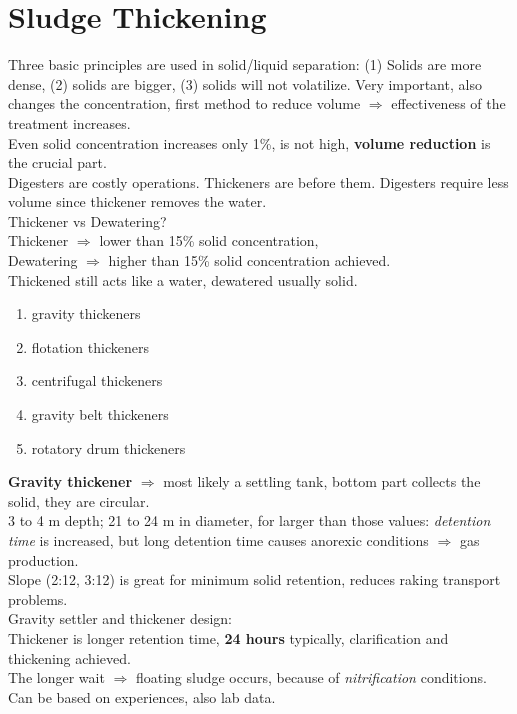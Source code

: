 \documentclass{article}
\numberwithin{equation}{section}
\begin{document}
\section{Sludge Thickening}
Three basic principles are used in solid/liquid separation: (1) Solids are more dense, (2) solids are bigger, (3) solids will not volatilize. Very important, also changes the concentration, first method to reduce volume
$\Rightarrow$ effectiveness of the treatment increases.\\
Even solid concentration increases only 1\%, is not high, \textbf{volume reduction} is the crucial part.\\
Digesters are costly operations. Thickeners are before them. Digesters require less volume since thickener removes the water.\\
Thickener vs Dewatering?\\
Thickener $\Rightarrow$ lower than 15\% solid concentration,\\
Dewatering $\Rightarrow$ higher than 15\% solid concentration achieved.\\
Thickened still acts like a water, dewatered usually solid.
\begin{enumerate}
    \item gravity thickeners
    \item flotation thickeners
    \item centrifugal thickeners
    \item gravity belt thickeners
    \item rotatory drum thickeners
\end{enumerate}
\textbf{Gravity thickener} $\Rightarrow$ most likely a settling tank, bottom part collects the solid, they are circular.\\
3 to 4 m depth; 21 to 24 m in diameter, for larger than those values: \emph{detention time} is increased, but long detention time causes anorexic conditions $\Rightarrow$ gas production.\\
Slope (2:12, 3:12) is great for minimum solid retention, reduces raking transport problems.\\
Gravity settler and thickener design:\\
Thickener is longer retention time, \textbf{24 hours} typically, clarification and thickening achieved.\\
The longer wait $\Rightarrow$ floating sludge occurs, because of \emph{nitrification} conditions.\\
Can be based on experiences, also lab data.\\
\end{document}
